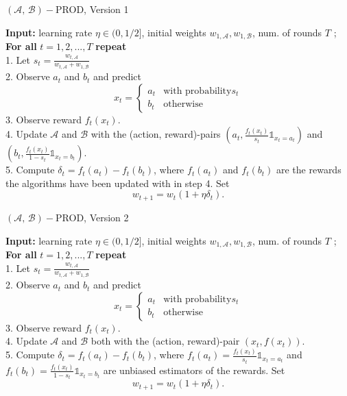 \documentclass[10.5pt]{article}
\begin{document}
\begin{minipage}{.5\textwidth}
  \begin{algorithm}[H] 
    \caption{$(\mathcal{A},\, \mathcal{B})-$PROD, Version 1} \label{Prod1}
    \textbf{Input:} learning rate $\eta \in (0, 1/2]$, initial weights $w_{1,\mathcal{A}} , w_{1,\mathcal{B} }$, num. of rounds $T$ ;\\
\textbf{For all} $t = 1, 2, ... , T$ \textbf{repeat} \\
1. Let $s_t = \frac{w_{t,\mathcal{A}}}{w_{t,\mathcal{A}} + w_{1,\mathcal{B}}} $\\
2. Observe $a_t$ and $b_t$ and predict
$$ x_t = \begin{cases}a_t&\text{with probability} s_t\\b_t&\text{otherwise}\end{cases}$$
3. Observe reward $f_t(x_t)$. \\
4. Update $\mathcal{A}$ and $\mathcal{B}$  with the (action, reward)-pairs $(a_t, \frac{f_t(x_t)}{s_t} \mathds{1}_{x_t = a_t})$ and $(b_t, \frac{f_t(x_t)}{1 - s_t} \mathds{1}_{x_t = b_t})$. \\
5. Compute $\delta_t = f_t(a_t) - f_t(b_t)$, where $f_t(a_t)$ and $f_t(b_t)$ are the rewards the algorithms have been updated with in step 4. Set
$$ w_{t+1} = w_t (1 + \eta \delta_t). $$
      \end{algorithm}
\end{minipage}%
\begin{minipage}{.5\textwidth}
  \begin{algorithm}[H]
    \caption{$(\mathcal{A},\, \mathcal{B})-$PROD, Version 2}  \label{Prod2}
    \textbf{Input:} learning rate $\eta \in (0, 1/2]$, initial weights $w_{1,\mathcal{A}} , w_{1,\mathcal{B} }$, num. of rounds $T$ ;\\
\textbf{For all} $t = 1, 2, ... , T$ \textbf{repeat} \\
1. Let $s_t = \frac{w_{t,\mathcal{A}}}{w_{t,\mathcal{A}} + w_{1,\mathcal{B}}} $\\
2. Observe $a_t$ and $b_t$ and predict
$$ x_t = \begin{cases}a_t&\text{with probability} s_t\\b_t&\text{otherwise}\end{cases}$$
3. Observe reward $f_t(x_t)$. \\
4. Update $\mathcal{A}$ and $\mathcal{B}$  both with the (action, reward)-pair $(x_t, f(x_t))$. \\
5. Compute $\delta_t = f_t(a_t) - f_t(b_t)$, where $f_t(a_t) = \frac{f_t(x_t)}{s_t} \mathds{1}_{x_t = a_t}$ and $f_t(b_t) = \frac{f_t(x_t)}{1 - s_t} \mathds{1}_{x_t = b_t}$ are unbiased estimators of the rewards. Set
$$ w_{t+1} = w_t (1 + \eta \delta_t). $$
  \end{algorithm}
\end{minipage}
\end{document}
